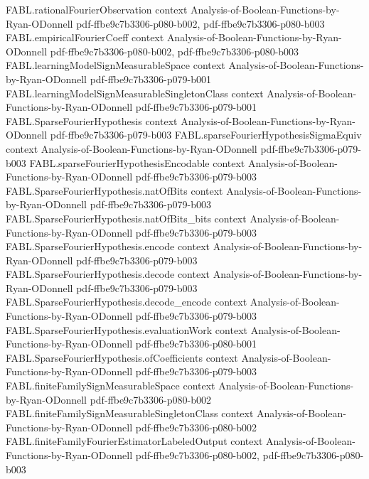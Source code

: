 \begin{theorem}
\proofstep
  {FABL.rationalFourierObservation}
  {context}
  {Analysis-of-Boolean-Functions-by-Ryan-ODonnell}
  {pdf-ffbe9c7b3306-p080-b002,
    pdf-ffbe9c7b3306-p080-b003}
\proofstep
  {FABL.empiricalFourierCoeff}
  {context}
  {Analysis-of-Boolean-Functions-by-Ryan-ODonnell}
  {pdf-ffbe9c7b3306-p080-b002,
    pdf-ffbe9c7b3306-p080-b003}
\proofstep
  {FABL.learningModelSignMeasurableSpace}
  {context}
  {Analysis-of-Boolean-Functions-by-Ryan-ODonnell}
  {pdf-ffbe9c7b3306-p079-b001}
\proofstep
  {FABL.learningModelSignMeasurableSingletonClass}
  {context}
  {Analysis-of-Boolean-Functions-by-Ryan-ODonnell}
  {pdf-ffbe9c7b3306-p079-b001}
\proofstep
  {FABL.SparseFourierHypothesis}
  {context}
  {Analysis-of-Boolean-Functions-by-Ryan-ODonnell}
  {pdf-ffbe9c7b3306-p079-b003}
\proofstep
  {FABL.sparseFourierHypothesisSigmaEquiv}
  {context}
  {Analysis-of-Boolean-Functions-by-Ryan-ODonnell}
  {pdf-ffbe9c7b3306-p079-b003}
\proofstep
  {FABL.sparseFourierHypothesisEncodable}
  {context}
  {Analysis-of-Boolean-Functions-by-Ryan-ODonnell}
  {pdf-ffbe9c7b3306-p079-b003}
\proofstep
  {FABL.SparseFourierHypothesis.natOfBits}
  {context}
  {Analysis-of-Boolean-Functions-by-Ryan-ODonnell}
  {pdf-ffbe9c7b3306-p079-b003}
\proofstep
  {FABL.SparseFourierHypothesis.natOfBits_bits}
  {context}
  {Analysis-of-Boolean-Functions-by-Ryan-ODonnell}
  {pdf-ffbe9c7b3306-p079-b003}
\proofstep
  {FABL.SparseFourierHypothesis.encode}
  {context}
  {Analysis-of-Boolean-Functions-by-Ryan-ODonnell}
  {pdf-ffbe9c7b3306-p079-b003}
\proofstep
  {FABL.SparseFourierHypothesis.decode}
  {context}
  {Analysis-of-Boolean-Functions-by-Ryan-ODonnell}
  {pdf-ffbe9c7b3306-p079-b003}
\proofstep
  {FABL.SparseFourierHypothesis.decode_encode}
  {context}
  {Analysis-of-Boolean-Functions-by-Ryan-ODonnell}
  {pdf-ffbe9c7b3306-p079-b003}
\proofstep
  {FABL.SparseFourierHypothesis.evaluationWork}
  {context}
  {Analysis-of-Boolean-Functions-by-Ryan-ODonnell}
  {pdf-ffbe9c7b3306-p080-b001}
\proofstep
  {FABL.SparseFourierHypothesis.ofCoefficients}
  {context}
  {Analysis-of-Boolean-Functions-by-Ryan-ODonnell}
  {pdf-ffbe9c7b3306-p079-b003}
\proofstep
  {FABL.finiteFamilySignMeasurableSpace}
  {context}
  {Analysis-of-Boolean-Functions-by-Ryan-ODonnell}
  {pdf-ffbe9c7b3306-p080-b002}
\proofstep
  {FABL.finiteFamilySignMeasurableSingletonClass}
  {context}
  {Analysis-of-Boolean-Functions-by-Ryan-ODonnell}
  {pdf-ffbe9c7b3306-p080-b002}
\proofstep
  {FABL.finiteFamilyFourierEstimatorLabeledOutput}
  {context}
  {Analysis-of-Boolean-Functions-by-Ryan-ODonnell}
  {pdf-ffbe9c7b3306-p080-b002,
    pdf-ffbe9c7b3306-p080-b003}

\end{theorem}
